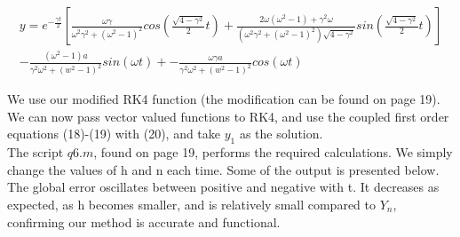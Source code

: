 \documentclass[10pt,a4paper]{report}
\begin{document}
\begin{multline*}
y = e^{-\frac{\gamma t}{2}}\left[\frac{\omega\gamma}{\omega^2\gamma^2+(\omega^2 -1)^2}cos(\frac{\sqrt{4 - \gamma ^2}}{2}t)+\frac{2\omega(\omega^2-1)+\gamma^2\omega}{(\omega^2\gamma^2+(\omega^2 -1)^2)\sqrt{4-\gamma^2}}sin(\frac{\sqrt{4 - \gamma ^2}}{2}t)\right]
\\
-\frac{(\omega^2-1)a}{\gamma^2\omega^2+(w^2-1)^2}sin(\omega t) + -\frac{\omega\gamma a}{\gamma^2\omega^2+(w^2-1)^2}cos(\omega t)
\end{multline*}

We use our modified RK4 function (the modification can be found on page 19). We can now pass vector valued functions to RK4, and use the coupled first order equations (18)-(19) with (20), and take $y_1$ as the solution. \\

The script $q6.m$, found on page 19, performs the required calculations. We simply change the values of h and n each time. Some of the output is presented below. The global error oscillates between positive and negative with t. It decreases as expected, as h becomes smaller, and is relatively small compared to $Y_n$, confirming our method is accurate and functional.	\\
\end{document}
